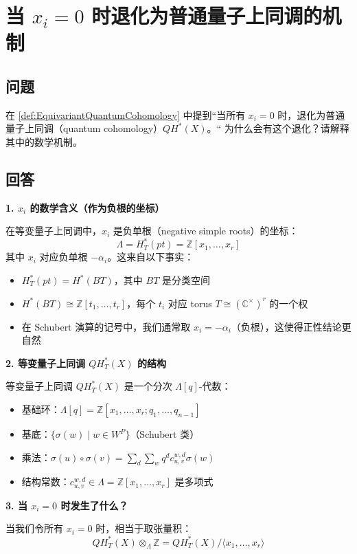\section{当 $x_i = 0$ 时退化为普通量子上同调的机制}\label{sec:xi-zero-degeneracy}
\subsection{问题}
在 \cref{def:EquivariantQuantumCohomology} 中提到``当所有 $x_i = 0$ 时，退化为普通量子上同调（quantum cohomology）$QH^*(X)$。`` 为什么会有这个退化？请解释其中的数学机制。

\subsection{回答}
\textbf{1. $x_i$ 的数学含义（作为负根的坐标）}

在等变量子上同调中，$x_i$ 是负单根（negative simple roots）的坐标：
$$\Lambda = H_T^*(pt) = \mathbb{Z}[x_1, \ldots, x_r]$$
其中 $x_i$ 对应负单根 $-\alpha_i$。这来自以下事实：
\begin{itemize}
\item $H_T^*(pt) = H^*(BT)$，其中 $BT$ 是分类空间
\item $H^*(BT) \cong \mathbb{Z}[t_1, \ldots, t_r]$，每个 $t_i$ 对应 torus $T \cong (\mathbb{C}^\times)^r$ 的一个权
\item 在 Schubert 演算的记号中，我们通常取 $x_i = -\alpha_i$（负根），这使得正性结论更自然
\end{itemize}

\textbf{2. 等变量子上同调 $QH_T^*(X)$ 的结构}

等变量子上同调 $QH_T^*(X)$ 是一个分次 $\Lambda[q]$-代数：
\begin{itemize}
\item 基础环：$\Lambda[q] = \mathbb{Z}[x_1, \ldots, x_r; q_1, \ldots, q_{n-1}]$
\item 基底：$\{\sigma(w) \mid w \in W^P\}$（Schubert 类）
\item 乘法：$\sigma(u) \circ \sigma(v) = \sum_{d} \sum_{w} q^d c_{u,v}^{w,d} \sigma(w)$
\item 结构常数：$c_{u,v}^{w,d} \in \Lambda = \mathbb{Z}[x_1, \ldots, x_r]$ 是多项式
\end{itemize}

\textbf{3. 当 $x_i = 0$ 时发生了什么？}

当我们令所有 $x_i = 0$ 时，相当于取张量积：
$$QH_T^*(X) \otimes_{\Lambda} \mathbb{Z} = QH_T^*(X) / \langle x_1, \ldots, x_r \rangle$$

